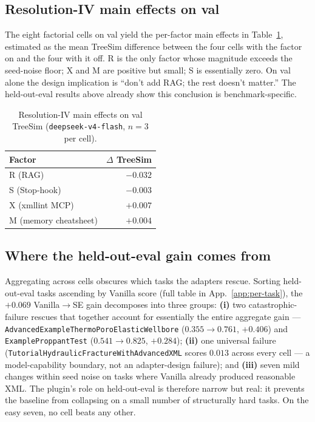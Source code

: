 \documentclass{article}
\begin{document}
\subsection{Resolution-IV main effects on val}
\label{subsec:main-effects}

The eight factorial cells on val yield the per-factor main effects in Table~\ref{tab:main-effects}, estimated as the mean TreeSim difference between the four cells with the factor on and the four with it off. R is the only factor whose magnitude exceeds the seed-noise floor; X and M are positive but small; S is essentially zero. On val alone the design implication is ``don't add RAG; the rest doesn't matter.'' The held-out-eval results above already show this conclusion is benchmark-specific.

\begin{table}[h]
  \caption{Resolution-IV main effects on val TreeSim (\texttt{deepseek-v4-flash}, $n=3$ per cell).}
  \label{tab:main-effects}
  \centering
  \small
  \begin{tabular}{lr}
    \toprule
    \textbf{Factor} & \textbf{$\Delta$ TreeSim} \\
    \midrule
    R (RAG)                & $-0.032$ \\
    S (Stop-hook)          & $-0.003$ \\
    X (xmllint MCP)        & $+0.007$ \\
    M (memory cheatsheet)  & $+0.004$ \\
    \bottomrule
  \end{tabular}
\end{table}

\subsection{Where the held-out-eval gain comes from}
\label{subsec:per-task}

Aggregating across cells obscures which tasks the adapters rescue. Sorting held-out-eval tasks ascending by Vanilla score (full table in App.~\ref{app:per-task}), the $+0.069$ Vanilla$\to$SE gain decomposes into three groups: \textbf{(i)} two catastrophic-failure rescues that together account for essentially the entire aggregate gain --- \texttt{AdvancedExampleThermoPoroElasticWellbore} ($0.355 \to 0.761$, $+0.406$) and \texttt{ExampleProppantTest} ($0.541 \to 0.825$, $+0.284$); \textbf{(ii)} one universal failure (\texttt{TutorialHydraulicFractureWithAdvancedXML} scores $0.013$ across every cell --- a model-capability boundary, not an adapter-design failure); and \textbf{(iii)} seven mild changes within seed noise on tasks where Vanilla already produced reasonable XML. The plugin's role on held-out-eval is therefore narrow but real: it prevents the baseline from collapsing on a small number of structurally hard tasks. On the easy seven, no cell beats any other.
\end{document}
